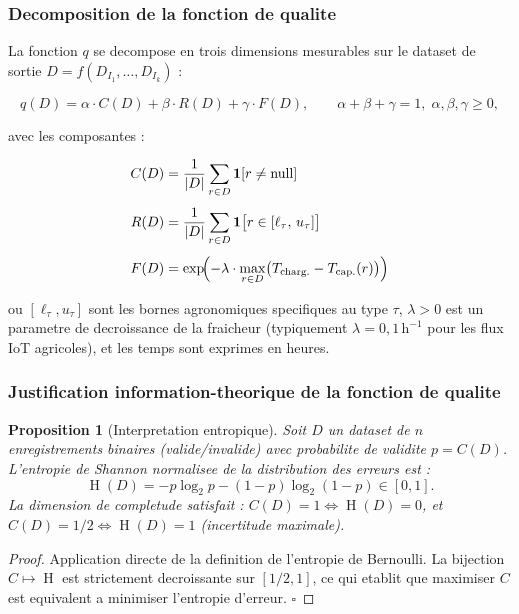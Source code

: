 \documentclass[12pt,a4paper]{article}
\theoremstyle{plain}
\newtheorem{proposition}[theorem]{Proposition}
\theoremstyle{definition}
\theoremstyle{remark}
\DeclareMathOperator{\ent}{H}
\begin{document}
\subsubsection{Decomposition de la fonction de qualite}
\label{subsec:quality_func}

La fonction $q$ se decompose en trois dimensions mesurables sur le
dataset de sortie $D = f(D_{I_1},\ldots,D_{I_k})$ :

\begin{equation}
q(D) = \alpha \cdot C(D) + \beta \cdot R(D) + \gamma \cdot F(D),
\qquad \alpha+\beta+\gamma=1,\; \alpha,\beta,\gamma \geq 0,
\label{eq:qtask}
\end{equation}

avec les composantes :

\begin{align}
C(D) &= \frac{1}{|D|}\sum_{r \in D} \mathbf{1}[r \neq \text{null}]
\label{eq:C}\\[4pt]
R(D) &= \frac{1}{|D|}\sum_{r \in D}
         \mathbf{1}\bigl[r \in [\ell_\tau,\, u_\tau]\bigr]
\label{eq:R}\\[4pt]
F(D) &= \exp\!\Bigl(-\lambda \cdot
         \max_{r \in D}\bigl(T_{\text{charg.}} - T_{\text{cap.}}(r)\bigr)\Bigr)
\label{eq:F}
\end{align}

ou $[\ell_\tau, u_\tau]$ sont les bornes agronomiques specifiques au type
$\tau$, $\lambda > 0$ est un parametre de decroissance de la fraicheur
(typiquement $\lambda = 0{,}1\,\text{h}^{-1}$ pour les flux IoT
agricoles), et les temps sont exprimes en heures.

\subsubsection{Justification information-theorique de la fonction de qualite}
\label{subsec:info_theo}

\begin{proposition}[Interpretation entropique]
\label{prop:entropy}
Soit $D$ un dataset de $n$ enregistrements binaires (valide/invalide)
avec probabilite de validite $p = C(D)$.
L'entropie de Shannon normalisee de la distribution des erreurs est :
\[
\ent(D) = -p\log_2 p - (1-p)\log_2(1-p) \in [0,1].
\]
La dimension de completude satisfait :
$C(D) = 1 \Leftrightarrow \ent(D) = 0$,
et $C(D) = 1/2 \Leftrightarrow \ent(D) = 1$ (incertitude maximale).
\end{proposition}

\begin{proof}
Application directe de la definition de l'entropie de Bernoulli.
La bijection $C \mapsto \ent$ est strictement decroissante sur
$[1/2, 1]$, ce qui etablit que maximiser $C$ est equivalent a
minimiser l'entropie d'erreur. \hfill$\square$
\end{proof}
\end{document}
